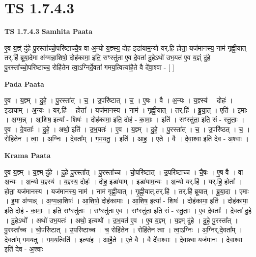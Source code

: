 \documentclass[17pt]{extarticle}
\begin{document}
\section{ TS 1.7.4.3 }

\textbf{TS 1.7.4.3 } \newline
\textbf{Samhita Paata} \newline

ए॒व य॒ज्ञ्ं दु॑हे पु॒रस्ता᳚च्चो॒परि॑ष्टाच्चै॒ष वा अ॒न्यो य॒ज्ञ्स्य॒ दोह॒ इडा॑याम॒न्यो यर्.हि॒ होता॒ यज॑मानस्य॒ नाम॑ गृह्णी॒यात् तर्.हि॑ ब्रूया॒देमा अ॑ग्मन्ना॒शिषो॒ दोह॑कामा॒ इति॒ सꣳस्तु॑ता ए॒व दे॒वता॑ दु॒हेऽथो॑ उभ॒यत॑ ए॒व य॒ज्ञ्ं दु॑हे पु॒रस्ता᳚च्चो॒परि॑ष्टाच्च॒ रोहि॑तेन त्वा॒ऽग्निर्दे॒वतां᳚ गमय॒त्वित्या॑है॒ते वै दे॑वा॒श्वा - [ ] \newline

\textbf{Pada Paata} \newline

ए॒व । य॒ज्ञ्म् । दु॒हे॒ । पु॒रस्ता᳚त् । च॒ । उ॒परि॑ष्टात् । च॒ । ए॒षः । वै । अ॒न्यः । य॒ज्ञ्स्य॑ । दोहः॑ । इडा॑याम् । अ॒न्यः । यर्.हि॑ । होता᳚ । यज॑मानस्य । नाम॑ । गृ॒ह्णी॒यात् । तर्.हि॑ । ब्रू॒या॒त् । एति॑ । इ॒माः । अ॒ग्म॒न्न् । आ॒शिष॒ इत्या᳚ - शिषः॑ । दोह॑कामा॒ इति॒ दोह॑ - का॒माः॒ । इति॑ । सꣳस्तु॑ता॒ इति॒ सं - स्तु॒ताः॒ । ए॒व । दे॒वताः᳚ । दु॒हे॒ । अथो॒ इति॑ । उ॒भ॒यतः॑ । ए॒व । य॒ज्ञ्म् । दु॒हे॒ । पु॒रस्ता᳚त् । च॒ । उ॒परि॑ष्ठत् । च॒ । रोहि॑तेन । त्वा॒ । अ॒ग्निः । दे॒वता᳚म् । ग॒म॒य॒तु॒ । इति॑ । आ॒ह॒ । ए॒ते । वै । दे॒वा॒श्वा इति॑ देव - अ॒श्वाः ।  \newline


\textbf{Krama Paata} \newline

ए॒व य॒ज्ञ्म् । य॒ज्ञ्म् दु॑हे । दु॒हे॒ पु॒रस्ता᳚त् । पु॒रस्ता᳚च्च । चो॒परि॑ष्टात् । उ॒परि॑ष्टाच्च । चै॒षः । ए॒ष वै । वा अ॒न्यः । अ॒न्यो य॒ज्ञ्स्य॑ । य॒ज्ञ्स्य॒ दोहः॑ । दोह॒ इडा॑याम् । इडा॑याम॒न्यः । अ॒न्यो यर्.हि॑ । यर्.हि॒ होता᳚ । होता॒ यज॑मानस्य । यज॑मानस्य॒ नाम॑ । नाम॑ गृह्णी॒यात् । गृ॒ह्णी॒यात्,तर्.हि॑ । तर्.हि॑ ब्रूयात् । ब्रू॒या॒दा । एमाः । इ॒मा अ॑ग्मन्न् । अ॒ग्म॒न्ना॒शिषः॑ । आ॒शिषो॒ दोह॑कामाः । आ॒शिष॒ इत्या᳚ - शिषः॑ । दोह॑कामा॒ इति॑ । दोह॑कामा॒ इति॒ दोह॑ - का॒माः॒ । इति॒ सꣳस्तु॑ताः । सꣳस्तु॑ता ए॒व । सꣳस्तु॑ता॒ इति॒ सं - स्तु॒ताः॒ । ए॒व दे॒वताः᳚ । दे॒वता॑ दु॒हे । दु॒हेऽथो᳚ । अथो॑ उभ॒यतः॑ । अथो॒ इत्यथो᳚ । उ॒भ॒यत॑ ए॒व । ए॒व य॒ज्ञ्म् । य॒ज्ञ्म् दु॑हे । दु॒हे॒ पु॒रस्ता᳚त् । पु॒रस्ता᳚च्च । चो॒परि॑ष्टात् । उ॒परि॑ष्टाच्च । च॒ रोहि॑तेन । रोहि॑तेन त्वा । त्वा॒ऽग्निः । अ॒ग्निर्,दे॒वता᳚म् । दे॒वता᳚म् गमयतु । ग॒म॒य॒त्विति॑ । इत्या॑ह । आ॒है॒ते । ए॒ते वै । वै दे॑वा॒श्वाः । दे॒वा॒श्वा यज॑मानः । दे॒वा॒श्वा इति॑ देव - अ॒श्वाः \newline
\end{document}
